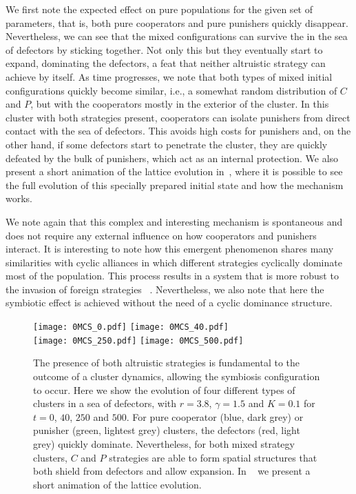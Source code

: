\documentclass[5p]{elsarticle}
\begin{document}
We first note the expected effect on pure populations for the given set of parameters, that is, both pure cooperators and pure punishers quickly disappear.
%
Nevertheless, we can see that the mixed configurations can survive the {in the} sea of defectors by sticking together. Not only this but they eventually start to expand, dominating the defectors, a feat that neither altruistic strategy can achieve by itself.
%
As time {progresses}, we note that both types of mixed initial configurations quickly become similar, i.e., a somewhat random distribution of $C$ and $P$, but with the cooperators mostly in the exterior of the cluster.
%
In this cluster with both strategies present, cooperators can isolate punishers from direct contact with the sea of defectors. 
%
This avoids high costs for punishers and, on the other hand, if some defectors start to penetrate the cluster, they are quickly defeated by the bulk of punishers, which act as an internal protection. 
%
We also present a short animation of the lattice evolution in~\cite{gif_fig6}, where it is possible to see the full evolution of this specially prepared initial state and how the mechanism works.
%

We note again that this complex and interesting mechanism is spontaneous and does not require any external influence on how cooperators and punishers interact.
%
It is interesting to note how this emergent phenomenon shares many similarities with cyclic alliances {in which} different strategies cyclically dominate most of the population. {This process results} in a system that is more robust to the invasion of foreign strategies ~\cite{Szabo2007,Cazaubiel2017}. Nevertheless, we also note that here the symbiotic effect is achieved without the need of a cyclic dominance structure.


\begin{figure}[t]
\begin{center}
\texttt{[image: 0MCS\_0.pdf]}
\texttt{[image: 0MCS\_40.pdf]} \\
\vspace{0.1cm} %
\hspace{0.05cm}
\texttt{[image: 0MCS\_250.pdf]}
\texttt{[image: 0MCS\_500.pdf]}
\caption{{The presence of both altruistic strategies is fundamental to the outcome of a cluster dynamics, allowing the symbiosis configuration to occur.} Here we show the evolution of four different types of clusters in a sea of defectors, with $r = 3.8$, $\gamma=1.5$ {and $K=0.1$} for $t=0$, $40$, $250$ and $500$. For pure cooperator (blue, dark grey) or punisher (green, lightest grey) clusters, the defectors (red, light grey)  quickly dominate. Nevertheless, for both mixed strategy clusters, $C$ and $P$ strategies are able to form spatial structures that both shield from defectors and allow expansion. In ~\cite{gif_fig6} we present a short animation of the lattice evolution.}
\label{fig-time-evo}
\end{center}
\end{figure}
\end{document}
